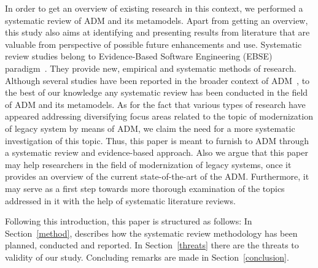 In order to get an overview of existing research in this context, we performed a systematic review of ADM and its metamodels. Apart from getting an overview, this study also aims at identifying and presenting results from literature that are valuable from perspective of possible future enhancements and use. Systematic review studies belong to Evidence-Based Software Engineering (EBSE) paradigm~\cite{Kitchenham}. They provide new, empirical and systematic methods of research. Although several studies have been reported in the broader context of ADM~\cite{PerezCastillo20121370, SMR:SMR582, FuentesFernandez2012247, PrezCastillo2011519}, to the best of our knowledge any systematic review has been conducted in the field of ADM and its metamodels. As for the fact that various types of research have appeared addressing diversifying focus areas related to the topic of modernization of legacy system by means of ADM, we claim the need for a more systematic investigation of this topic. Thus, this paper is meant to furnish to ADM through a systematic review and evidence-based approach. Also we argue that this paper may help researchers in the field of modernization of legacy systems, once it provides an overview of the current state-of-the-art of the ADM. Furthermore, it may serve as a first step towards more thorough examination of the topics addressed in it with the help of systematic literature reviews.

Following this introduction, this paper is structured as follows: In Section~\ref{method}, describes how the systematic review methodology has been planned, conducted and reported. In Section~\ref{threats} there are the threats to validity of our study. Concluding remarks are made in Section~\ref{conclusion}.